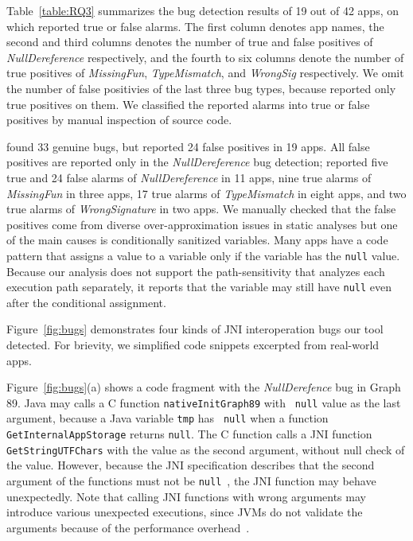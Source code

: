 Table~\ref{table:RQ3} summarizes the bug detection results of 19 out of 42
apps, on which \ours reported true or false alarms.  The first
column denotes app names, the second and third columns denotes the
number of true and false positives of {\it NullDereference} respectively, and
the fourth to six columns denote the number of true positives of {\it
MissingFun}, {\it TypeMismatch}, and {\it WrongSig} respectively. We omit the
number of false positivies of the last three bug types, because \ours
reported only true positives on them. We classified the reported alarms into
true or false positives by manual inspection of source code. 


\ours found 33 genuine bugs, but reported 24 false positives in 19
apps. All false positives are reported only in the {\it
NullDereference} bug detection; \ours reported five true and 24 false alarms
of {\it NullDereference} in 11 apps, nine true alarms of {\it MissingFun} in
three apps, 17 true alarms of {\it TypeMismatch} in eight apps, and two true
alarms of {\it WrongSignature} in two apps. We manually checked that the false
positives come from diverse over-approximation issues in static analyses but
one of the main causes is conditionally sanitized variables.  Many apps
have a code pattern that assigns a value to a variable only if the variable has
the {\tt null} value. Because our analysis does not support the
path-sensitivity that analyzes each execution path separately, it reports that
the variable may still have {\tt null} even after the conditional assignment. 



Figure~\ref{fig:bugs} demonstrates four kinds of JNI interoperation bugs our
tool detected.  For brievity, we simplified code snippets excerpted from
real-world apps. 

Figure~\ref{fig:bugs}(a) shows a code fragment with the {\it NullDerefence} bug
in Graph 89. Java may calls a C function {\tt nativeInitGraph89} with {\tt
null} value as the last argument, because a Java variable {\tt tmp} has {\tt
null} when a function {\tt GetInternalAppStorage} returns {\tt null}.  The C
function calls a JNI function {\tt GetStringUTFChars} with the value as the
second argument, without null check of the value. However, because the JNI
specification describes that the second argument of the functions must not be
{\tt null}~\cite{getstringutfchars}, the JNI function may behave unexpectedly.
Note that calling JNI functions with wrong arguments may introduce various
unexpected executions, since JVMs do not validate the arguments because of the
performance overhead~\cite{hwang2021justgen}.

